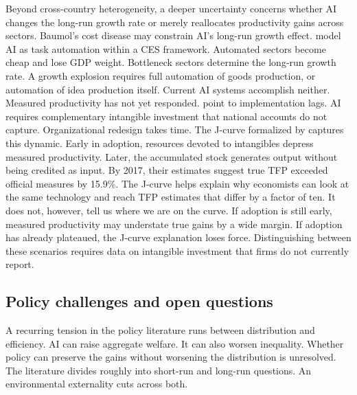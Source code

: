 \documentclass[12pt]{article}
\begin{document}
Beyond cross-country heterogeneity, a deeper uncertainty concerns whether AI changes the long-run growth rate or merely reallocates productivity gains across sectors. Baumol's cost disease may constrain AI's long-run growth effect. \citet{aghion2018} model AI as task automation within a CES framework. Automated sectors become cheap and lose GDP weight. Bottleneck sectors determine the long-run growth rate. A growth explosion requires full automation of goods production, or automation of idea production itself. Current AI systems accomplish neither. Measured productivity has not yet responded. \citet{brynjolfsson2018paradox} point to implementation lags. AI requires complementary intangible investment that national accounts do not capture. Organizational redesign takes time. The J-curve formalized by \citet{brynjolfsson2021jcurve} captures this dynamic. Early in adoption, resources devoted to intangibles depress measured productivity. Later, the accumulated stock generates output without being credited as input. By 2017, their estimates suggest true TFP exceeded official measures by 15.9\%. The J-curve helps explain why economists can look at the same technology and reach TFP estimates that differ by a factor of ten. It does not, however, tell us where we are on the curve. If adoption is still early, measured productivity may understate true gains by a wide margin. If adoption has already plateaued, the J-curve explanation loses force. Distinguishing between these scenarios requires data on intangible investment that firms do not currently report.


\subsection{Policy challenges and open questions}

A recurring tension in the policy literature runs between distribution and efficiency. AI can raise aggregate welfare. It can also worsen inequality. Whether policy can preserve the gains without worsening the distribution is unresolved. The literature divides roughly into short-run and long-run questions. An environmental externality cuts across both.
\end{document}
